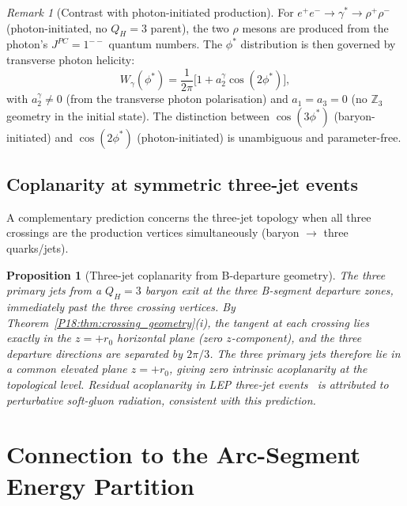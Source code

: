 \documentclass[11pt,a4paper]{article}
\newtheorem{proposition}[theorem]{Proposition}
\theoremstyle{definition}\newtheorem{definition}[theorem]{Definition}
\theoremstyle{remark}
\newtheorem{remark}[theorem]{Remark}
\newcommand{\QH}{Q_H}
\newcommand{\Zthree}{\mathbb{Z}_3}
\newcommand{\phistar}{\phi^*}
\begin{document}
\begin{remark}[Contrast with photon-initiated production]
\label{P18:rem:photon_contrast}
For $e^+e^-\to\gamma^*\to\rho^+\rho^-$ (photon-initiated, no
$\QH=3$ parent), the two $\rho$ mesons are produced from the
photon's $J^{PC}=1^{--}$ quantum numbers.  The $\phistar$
distribution is then governed by transverse photon helicity:
\begin{equation}
  W_{\gamma}(\phistar) = \frac{1}{2\pi}\bigl[
    1 + a_2^\gamma\cos(2\phistar)
  \bigr],
  \label{P18:eq:phi_star_photon}
\end{equation}
with $a_2^\gamma\neq0$ (from the transverse photon polarisation)
and $a_1=a_3=0$ (no $\Zthree$ geometry in the initial state).
The distinction between $\cos(3\phistar)$ (baryon-initiated) and
$\cos(2\phistar)$ (photon-initiated) is unambiguous and parameter-free.
\end{remark}

\subsection{Coplanarity at symmetric three-jet events}
\label{P18:sec:coplanarity}

A complementary prediction concerns the three-jet topology when
all three crossings are the production vertices simultaneously
(baryon $\to$ three quarks/jets).

\begin{proposition}[Three-jet coplanarity from B-departure geometry]
\label{P18:prop:coplanarity}
The three primary jets from a $\QH=3$ baryon exit at the three
B-segment departure zones, immediately past the three crossing
vertices.  By Theorem~\ref{P18:thm:crossing_geometry}(i), the tangent
at each crossing lies exactly in the $z=+r_0$ horizontal plane
(zero $z$-component), and the three departure directions are
separated by $2\pi/3$.  The three primary jets therefore lie in
a common elevated plane $z=+r_0$, giving zero intrinsic
acoplanarity at the topological level.  Residual acoplanarity in
LEP three-jet events~\cite{Abe1997,Acton1993,Botner1992} is
attributed to perturbative soft-gluon radiation, consistent with
this prediction.
\end{proposition}

\section{Connection to the Arc-Segment Energy Partition}
\label{P18:sec:arcseg}
\end{document}
